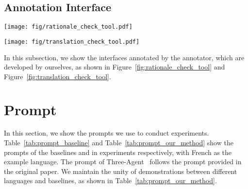 \subsection{Annotation Interface}
\label{subsec:Annotation Interface}
\begin{figure*}
    \centering
    \texttt{[image: fig/rationale\_check\_tool.pdf]}
    \vspace{-0.5em}
    \caption{
    The annotation interface is provided to annotators to check the accuracy of the generated rationales.
    }
    \label{fig:rationale_check_tool}
\end{figure*}

\begin{figure*}
    \centering
    \texttt{[image: fig/translation\_check\_tool.pdf]}
    \vspace{-0.5em}
    \caption{
    The annotation interface is provided to annotators to check the consistency of the back translation and the original English instance and refine the translated instances.
    }
    \label{fig:translation_check_tool}
\end{figure*}
In this subsection, we show the interfaces annotated by the annotator, which are developed by ourselves, as shown in Figure~\ref{fig:rationale_check_tool} and Figure~\ref{fig:translation_check_tool}.



\section{Prompt}
\label{sec:prompt}
In this section, we show the prompts we use to conduct experiments.
Table~\ref{tab:prompt_baseline} and Table~\ref{tab:prompt_our_method} show the prompts of the baselines and \ourmethod in experiments respectively, with French as the example language.
The prompt of Three-Agent~\cite{fatemi2024three-agent} follows the prompt provided in the original paper.
We maintain the unity of demonstrations between different languages and baselines, as shown in Table~\ref{tab:prompt_our_method}.

